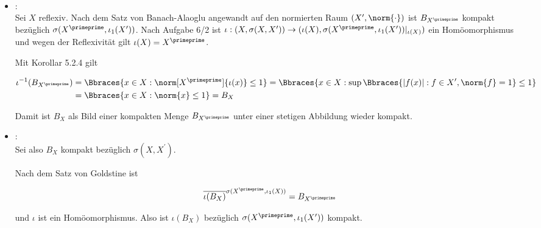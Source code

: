 \begin{solution}

\leavevmode \\


\begin{itemize}

  \item
  : \\

  Sei $X$ reflexiv.
  Nach dem Satz von Banach-Alaoglu angewandt auf den normierten Raum $(X^\prime,\norm{\cdot})$ ist $B_{X^\primeprime}$ kompakt bezüglich $\sigma(X^\primeprime, \iota_1(X^\prime))$.
  Nach Aufgabe 6/2 ist $\iota: (X,\sigma(X,X^\prime)) \to (\iota(X), \sigma(X^\primeprime,\iota_1(X^\prime))|_{\iota(X)})$ ein Homöomorphismus und wegen der Reflexivität gilt $\iota(X) = X^\primeprime$.


  Mit Korollar 5.2.4 gilt

  \begin{align*}
    \iota^{-1}(B_{X^\primeprime})
    & =
    \Bbraces
    {
      x \in X:
      \norm[X^\primeprime]{\iota(x)} \leq 1
    }
    =
    \Bbraces
    {
      x \in X:
      \sup \Bbraces
      {
        |f(x)|:
        f \in X^\prime,
        \norm{f} = 1
      }
      \leq 1
    } \\
    & =
    \Bbraces
    {
      x \in X:
      \norm{x} \leq 1
    }
    = B_X
  \end{align*}

  Damit ist $B_X$ als Bild einer kompakten Menge $B_{X^\primeprime}$ unter einer stetigen Abbildung wieder kompakt.

  \item
  : \\

  Sei also $B_X$ kompakt bezüglich $\sigma(X, X^\prime)$.


  Nach dem Satz von Goldstine ist

  \begin{align*}
    \overline
    {
      \iota(B_X)}^{\sigma(X^\primeprime, \iota_1(X))
    }
    =
    B_{X^\primeprime}
  \end{align*}

  und $\iota$ ist ein Homöomorphismus.
  Also ist $\iota(B_X)$ bezüglich $\sigma(X^\primeprime, \iota_1(X^\prime))$ kompakt.


\end{itemize}
\end{solution}
